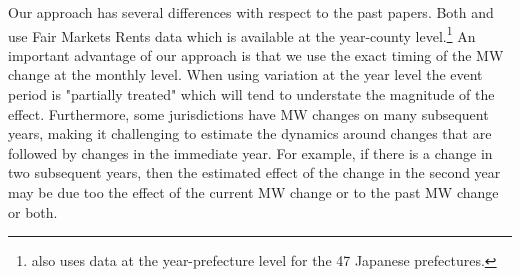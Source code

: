 \documentclass{article}
\begin{document}

Our approach has several differences with respect to the past papers. Both \textcite{tidemann2018mw} and \textcite{yamagishi2019minimum} use Fair Markets Rents data which is available at the year-county level.\footnote{\textcite{yamagishi2019minimum} also uses data at the year-prefecture level for the 47 Japanese prefectures.} An important advantage of our approach is that we use the exact timing of the MW change at the monthly level. When using variation at the year level the event period is "partially treated" which will tend to understate the magnitude of the effect. Furthermore, some jurisdictions have MW changes on many subsequent years, making it challenging to estimate the dynamics around changes that are followed by changes in the immediate year. For example, if there is a change in two subsequent years, then the estimated effect of the change in the second year may be due too the effect of the current MW change or to the past MW change or both.
\end{document}
